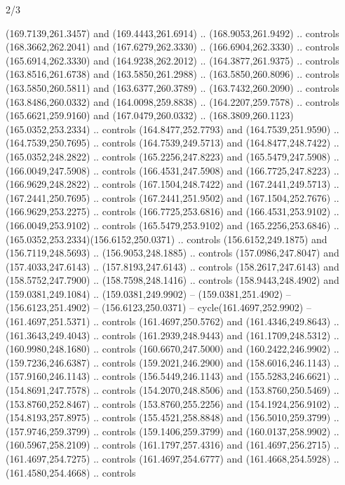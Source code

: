 \begin{flagdescription}{2/3}
\begin{scope}[xshift=0.5\flaglength,yshift=0.5\flagwidth,scale=\flagwidth/235.81]
\begin{scope}[y=0.8pt, x=0.8pt, yscale=-1,shift={(-239.08,-147.38)}]
    (169.7139,261.3457) and (169.4443,261.6914) .. (168.9053,261.9492) .. controls
    (168.3662,262.2041) and (167.6279,262.3330) .. (166.6904,262.3330) .. controls
    (165.6914,262.3330) and (164.9238,262.2012) .. (164.3877,261.9375) .. controls
    (163.8516,261.6738) and (163.5850,261.2988) .. (163.5850,260.8096) .. controls
    (163.5850,260.5811) and (163.6377,260.3789) .. (163.7432,260.2090) .. controls
    (163.8486,260.0332) and (164.0098,259.8838) .. (164.2207,259.7578) .. controls
    (165.6621,259.9160) and (167.0479,260.0332) ..
    (168.3809,260.1123)(165.0352,253.2334) .. controls (164.8477,252.7793) and
    (164.7539,251.9590) .. (164.7539,250.7695) .. controls (164.7539,249.5713) and
    (164.8477,248.7422) .. (165.0352,248.2822) .. controls (165.2256,247.8223) and
    (165.5479,247.5908) .. (166.0049,247.5908) .. controls (166.4531,247.5908) and
    (166.7725,247.8223) .. (166.9629,248.2822) .. controls (167.1504,248.7422) and
    (167.2441,249.5713) .. (167.2441,250.7695) .. controls (167.2441,251.9502) and
    (167.1504,252.7676) .. (166.9629,253.2275) .. controls (166.7725,253.6816) and
    (166.4531,253.9102) .. (166.0049,253.9102) .. controls (165.5479,253.9102) and
    (165.2256,253.6846) .. (165.0352,253.2334)(156.6152,250.0371) .. controls
    (156.6152,249.1875) and (156.7119,248.5693) .. (156.9053,248.1885) .. controls
    (157.0986,247.8047) and (157.4033,247.6143) .. (157.8193,247.6143) .. controls
    (158.2617,247.6143) and (158.5752,247.7900) .. (158.7598,248.1416) .. controls
    (158.9443,248.4902) and (159.0381,249.1084) .. (159.0381,249.9902) --
    (159.0381,251.4902) -- (156.6123,251.4902) -- (156.6123,250.0371) --
    cycle(161.4697,252.9902) -- (161.4697,251.5371) .. controls
    (161.4697,250.5762) and (161.4346,249.8643) .. (161.3643,249.4043) .. controls
    (161.2939,248.9443) and (161.1709,248.5312) .. (160.9980,248.1680) .. controls
    (160.6670,247.5000) and (160.2422,246.9902) .. (159.7236,246.6387) .. controls
    (159.2021,246.2900) and (158.6016,246.1143) .. (157.9160,246.1143) .. controls
    (156.5449,246.1143) and (155.5283,246.6621) .. (154.8691,247.7578) .. controls
    (154.2070,248.8506) and (153.8760,250.5469) .. (153.8760,252.8467) .. controls
    (153.8760,255.2256) and (154.1924,256.9102) .. (154.8193,257.8975) .. controls
    (155.4521,258.8848) and (156.5010,259.3799) .. (157.9746,259.3799) .. controls
    (159.1406,259.3799) and (160.0137,258.9902) .. (160.5967,258.2109) .. controls
    (161.1797,257.4316) and (161.4697,256.2715) .. (161.4697,254.7275) .. controls
    (161.4697,254.6777) and (161.4668,254.5928) .. (161.4580,254.4668) .. controls

\end{scope}
\end{scope}
\end{flagdescription}
